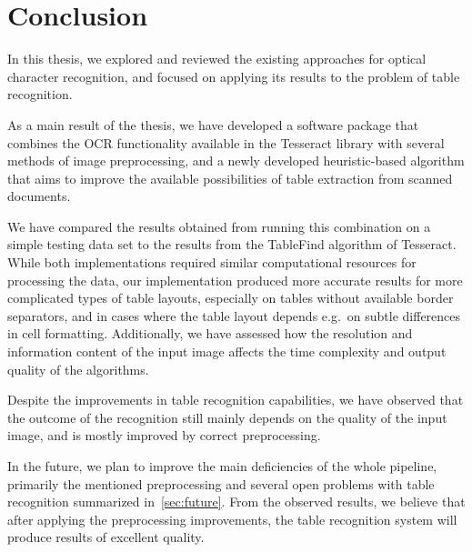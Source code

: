 \chapter*{Conclusion}

In this thesis, we explored and reviewed the existing approaches for optical character recognition, and focused on applying its results to the problem of table recognition.

As a main result of the thesis, we have developed a software package that combines the OCR functionality available in the Tesseract library with several methods of image preprocessing, and a newly developed heuristic-based algorithm that aims to improve the available possibilities of table extraction from scanned documents.

We have compared the results obtained from running this combination on a simple testing data set to the results from the TableFind algorithm of Tesseract. While both implementations required similar computational resources for processing the data, our implementation produced more accurate results for more complicated types of table layouts, especially on tables without available border separators, and in cases where the table layout depends e.g.~on subtle differences in cell formatting. Additionally, we have assessed how the resolution and information content of the input image affects the time complexity and output quality of the algorithms.

Despite the improvements in table recognition capabilities, we have observed that the outcome of the recognition still mainly depends on the quality of the input image, and is mostly improved by correct preprocessing.

In the future, we plan to improve the main deficiencies of the whole pipeline, primarily the mentioned preprocessing and several open problems with table recognition summarized in~\cref{sec:future}. From the observed results, we believe that after applying the preprocessing improvements, the table recognition system will produce results of excellent quality.